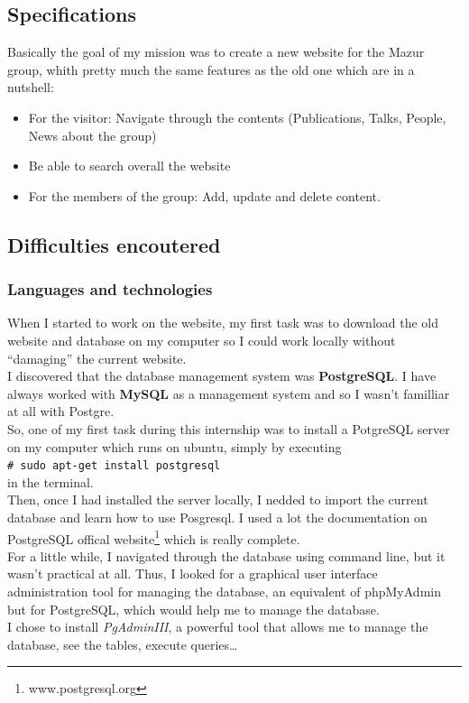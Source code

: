 \documentclass[10pt,a4paper]{article}
\newcommand{\shellcmd}[1]{\\\indent\indent\texttt{\footnotesize \# #1}\\}
\begin{document}
\subsection{Specifications}
Basically the goal of my mission was to create a new website for the Mazur group, whith pretty much the same features as the old one which are in a nutshell:
\begin{itemize}
\item For the visitor: Navigate through the contents (Publications, Talks, People, News about the group)
\item Be able to search overall the website
\item For the members of the group: Add, update and delete content.
\end{itemize}

\subsection{Difficulties encoutered}

\subsubsection*{Languages and technologies}
When I started to work on the website, my first task was to download the old website and database on my computer so I could work locally without ``damaging'' the current website.\\

I discovered that the database management system was \textbf{PostgreSQL}. I have always worked with \textbf{MySQL} as a management system and so I wasn't familliar at all with Postgre.\\
So, one of my first task during this internship was to install a PotgreSQL server on my computer which runs on ubuntu, simply by executing \shellcmd{sudo apt-get install postgresql} in the terminal.\\
Then, once I had installed the server locally, I nedded to import the current database and learn how to use Posgresql. I used a lot the documentation on PostgreSQL offical website\footnote{www.postgresql.org} which is really complete.\\

For a little while, I navigated through the database using command line, but it wasn't practical at all. Thus, I looked for a graphical user interface administration tool for managing the database, an equivalent of phpMyAdmin but for PostgreSQL, which would help me to manage the database.\\
I chose to install \textit{PgAdminIII}, a powerful tool that allows me to manage the database, see the tables, execute queries\ldots
\end{document}
